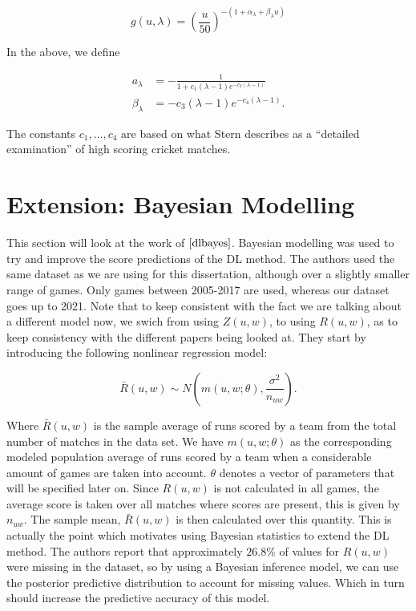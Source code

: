\begin{equation}
    \label{gfunc}
    g(u,\lambda) = \left (\frac{u}{50} \right)^{-(1+\alpha_\lambda+\beta_\lambda u)}
\end{equation}

In the above, we define 

\begin{align*}
    a_\lambda &= -\frac{1}{1+c_1(\lambda-1)e^{-c_2(\lambda-1)}}\\
    \beta_\lambda &= -c_3(\lambda-1)e^{-c_4(\lambda-1)}.
\end{align*}

The constants $c_1,\ldots,c_4$ are based on what Stern describes as a ``detailed examination'' of high scoring cricket matches.

\section{Extension: Bayesian Modelling}
This section will look at the work of $\cite{dlbayes}$. Bayesian modelling was used to try and improve the score predictions
of the DL method. The authors used the same dataset as we are using for this dissertation, although over a slightly smaller range of games.
Only games between 2005-2017 are used, whereas our dataset goes up to 2021. Note that to keep consistent with the fact we are talking about a different
model now, we swich from using $Z(u,w)$, to using $R(u,w)$, as to keep consistency with the different papers being looked at.
They start by introducing the following nonlinear regression model:

\begin{equation}
    \label{dlRegress}
    \bar{R}(u,w) \sim N(m(u,w;\theta),\frac{\sigma^2}{n_{uw}}).
\end{equation}

Where $\bar{R}(u,w)$ is the sample average of runs scored by a team from the total number of matches in the data set. We have $m(u,w;\theta)$
as the corresponding modeled population average of runs scored by a team when a considerable amount of games are taken into account. $\theta$ denotes 
a vector of parameters that will be specified later on. Since $R(u,w)$ is not calculated in all games, the average score is taken over all matches where
scores are present, this is given by $n_{uw}$. The sample mean, $\bar{R}(u,w)$ is then calculated over this quantity. This is actually the point which motivates
using Bayesian statistics to extend the DL method. The authors report that approximately $26.8\%$ of values for $R(u,w)$ were missing in the dataset, so by 
using a Bayesian inference model, we can use the posterior predictive distribution to account for missing values. Which in turn should increase the 
predictive accuracy of this model. \\


